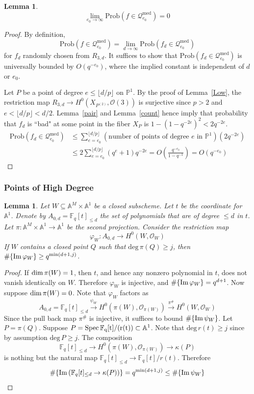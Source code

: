\documentclass[12pt]{article}
\theoremstyle{plain}
\newtheorem{lemma}[equation]{Lemma}
\theoremstyle{definition}
\newcommand{\IA}{\mathbb{A}}
\newcommand{\IF}{\mathbb{F}}
\newcommand{\IP}{\mathbb{P}}
\newcommand{\sO}{\mathcal{O}}
\newcommand{\sQ}{\mathcal{Q}}
\renewcommand{\deg}{\mathrm{deg}\,}
\newcommand{\Spec}{\rm Spec\,}
\renewcommand\dim{{\rm dim\,}}
\newcommand{\im}{{\rm Im\,}}
\newcommand{\<}{\langle}
\renewcommand{\>}{\rangle}
\newcommand{\Prob}{\mathrm{Prob}}
\begin{document}
\begin{lemma}
\label{Medium}
$$\lim_{e_0 \to \infty} \Prob( f \in  \sQ_{e_0}^{\mathrm{med}}) = 0 $$
\end{lemma}
\begin{proof}
By definition, 
$$ \Prob( f \in  \sQ_{e_0}^{\mathrm{med}}) = \lim_{d \to \infty} \Prob(f_d \in \sQ_{e_0}^{\mathrm{med}})$$
for $f_d$ randomly chosen from $R_{3, d}$. It suffices to show that $\Prob(f_d \in \sQ_{e_0}^{\mathrm{med}})$ is universally bounded by $O(q^{-e_0})$, where the implied constant is independent of $d$ or $e_0$. 

Let $P$ be a point of degree $e \le \lfloor d/p \rfloor$ on $\IP^1$. By the proof of Lemma~\ref{Low}, the restriction map $R_{3, d} \to H^0(X_{P^{(2)}}, \sO(3))$ is surjective since $p > 2$ and $e < \lfloor d/p \rfloor < d/2$. Lemma~\ref{pair} and Lemma~\ref{count} hence imply that probability that $f_d$ is ``bad" at some point in the fiber $X_P$ is $1 - (1 - q^{-2e})^2 < 2q^{-2e}$. 
\begin{align*}
\Prob(f_d \in \sQ_{e_0}^{\mathrm{med}}) &\le \sum_{e = e_0}^{\lfloor d/p \rfloor} (\text{number of points of degree $e$ in $\IP^1$})(2q^{-2e}) \\
&\le 2 \sum_{e = e_0}^{\lfloor d/p \rfloor}(q^{e} + 1) q^{-2e} = O(\frac{q^{-e_0}}{1 - q^{-1}}) = O(q^{-e_0})
\end{align*} 
\end{proof}

\subsubsection{Points of High Degree}
\begin{lemma}
\label{highprep}
Let $W \subseteq \IA^M \times \IA^1$ be a closed subscheme. Let $t$ be the coordinate for $\IA^1$. Denote by $A_{0, d} = \IF_q[t]_{\le d}$ the set of polynomials that are of degree $\le d$ in $t$. Let $\pi : \IA^M \times \IA^1 \to \IA^1$ be the second projection. Consider the restriction map 
$$ \varphi_W : A_{0, d} \to H^0(W, \sO_W) $$
If $W$ contains a closed point $Q$ such that $\deg \pi(Q) \ge j$, then $\# \{ \im \varphi_W \} \ge q^{\min(d + 1, j)}$. 
\end{lemma}
\begin{proof}
If $\dim \pi(W) = 1$, then $t$, and hence any nonzero polynomial in $t$, does not vanish identically on $W$. Therefore $\varphi_W$ is injective, and $\# \{ \im \varphi_W \} = q^{d + 1}$. 
Now suppose $\dim \pi(W) = 0$. Note that $\varphi_W$ factors as
$$ A_{0, d} = \IF_q[t]_{\le d} \stackrel{\psi_W}{\to} H^0(\pi(W), \sO_{\pi(W)}) \stackrel{\pi^\#}{\to} H^0(W, \sO_W) $$ 
Since the pull back map $\pi^\#$ is injective, it suffices to bound $\# \{\im \psi_W \}$. Let $P = \pi(Q)$. Suppose $P = \Spec \IF_q[t]/(r(t)) \subset \IA^1$. Note that $\deg r(t) \ge j$ since by assumption $\deg P \ge j$. The composition 
$$ \IF_q[t]_{\le d} \to H^0(\pi(W), \sO_{\pi(W)}) \to \kappa(P) $$
is nothing but the natural map $\IF_q[t]_{\le d} \to \IF_q[t]/r(t)$. Therefore 
$$ \#\{ \im(\IF_q[t]_{\le d} \to \kappa(P)) \} = q^{\min(d + 1, j)}  \le \# \{\im \psi_W \}$$
\end{proof}
\end{document}
